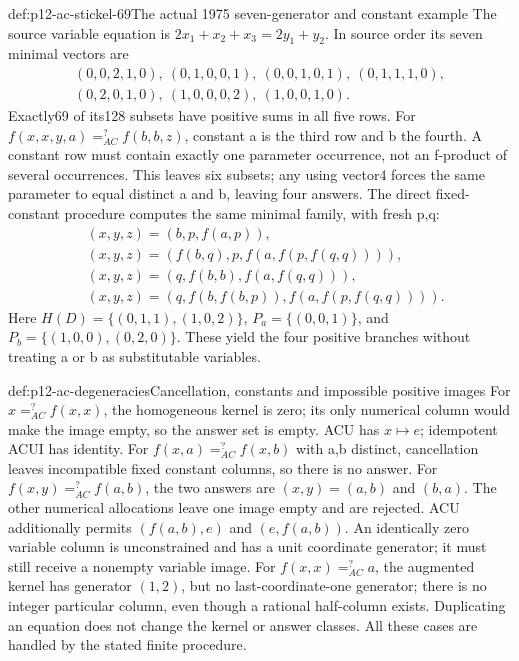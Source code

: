 \begin{hbexample}{def:p12-ac-stickel-69}{The actual 1975 seven-generator and constant example}
The source variable equation is
\(2x_1+x_2+x_3=2y_1+y_2\). In source order its seven minimal
vectors are
\[
\begin{gathered}
(0,0,2,1,0),\ (0,1,0,0,1),\ (0,0,1,0,1),\ (0,1,1,1,0),\\
(0,2,0,1,0),\ (1,0,0,0,2),\ (1,0,0,1,0).
\end{gathered}
\]
Exactly69 of its128 subsets have positive sums in all five rows.
For \(f(x,x,y,a)=^{?}_{AC}f(b,b,z)\), constant a is the
third row and b the fourth. A constant row must contain exactly
one parameter occurrence, not an f-product of several occurrences.
This leaves six subsets; any using vector4 forces the same parameter
to equal distinct a and b, leaving four answers. The direct fixed-
constant procedure computes the same minimal family, with fresh p,q:
\[
\begin{aligned}
 &(x,y,z)=(b,p,f(a,p)),\\
 &(x,y,z)=(f(b,q),p,f(a,f(p,f(q,q)))),\\
 &(x,y,z)=(q,f(b,b),f(a,f(q,q))),\\
 &(x,y,z)=(q,f(b,f(b,p)),f(a,f(p,f(q,q)))).
\end{aligned}
\]
Here \(H(D)=\{(0,1,1),(1,0,2)\}\),
\(P_a=\{(0,0,1)\}\), and
\(P_b=\{(1,0,0),(0,2,0)\}\). These yield the four positive
branches without treating a or b as substitutable variables.
\cite[pp.~73--75]{Stickel1975AC}
\end{hbexample}

\begin{hbexample}{def:p12-ac-degeneracies}{Cancellation, constants and impossible positive images}
For \(x=^{?}_{AC}f(x,x)\), the homogeneous kernel is zero;
its only numerical column would make the image empty, so the answer
set is empty. ACU has \(x\mapsto e\); idempotent ACUI has identity.
For \(f(x,a)=^{?}_{AC}f(x,b)\) with a,b distinct, cancellation
leaves incompatible fixed constant columns, so there is no answer.
For \(f(x,y)=^{?}_{AC}f(a,b)\), the two answers are
\((x,y)=(a,b)\) and \((b,a)\). The other numerical allocations
leave one image empty and are rejected. ACU additionally permits
\((f(a,b),e)\) and \((e,f(a,b))\).
An identically zero variable column is unconstrained and has a unit
coordinate generator; it must still receive a nonempty variable image.
For \(f(x,x)=^{?}_{AC}a\), the augmented kernel has generator
\((1,2)\), but no last-coordinate-one generator; there is no
integer particular column, even though a rational half-column exists.
Duplicating an equation does not change the kernel or answer classes.
All these cases are handled by the stated finite procedure.
\end{hbexample}

